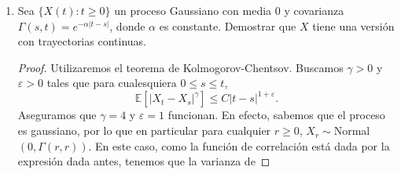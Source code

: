 \documentclass[letterpaper]{article}
\newcommand{\E}{\mathbb{E}}
\newcommand{\1}{\mathds{1}}
\theoremstyle{definition}
\theoremstyle{definition}
\theoremstyle{definition}
\theoremstyle{definition}
\theoremstyle{definition}
\begin{document}
\begin{enumerate}
\begin{proof}
        \begin{align*}
            f_{B(s)|B(t)}(x|y)=\frac{f_{\left(B(s),B(t)\right)}(x,y)}{f_{B(s)}(y)}&=\frac{\frac{1}{2\pi\sqrt{s(t-s)}}\exp\left\{-\frac{tx^2-2sxy+sy^2}{2s(t-s)}\right\}}{\frac{1}{\sqrt{2\pi t}}\exp\{-\frac{y^2}{2t}\}}\\
            &=\frac{1}{\sqrt{2\pi\tfrac{s}{t}(t-s)}}\exp\left\{-\frac{tx^2-2sxy+sy^2}{2s(t-s)}+\frac{y^2}{2t}\right\}\\
            &=\frac{1}{\sqrt{2\pi\tfrac{s}{t}(t-s)}}\exp\left\{-\frac{x^2-2\tfrac{s}{t}xy+\tfrac{s}{t}y^2}{2\tfrac{s}{t}(t-s)}+\frac{y^2}{2t}\right\}\\
            &=\frac{1}{\sqrt{2\pi\tfrac{s}{t}(t-s)}}\exp\left\{-\frac{x^2-2\tfrac{s}{t}xy+(\tfrac{s}{t}y)^2}{2\tfrac{s}{t}(t-s)}+\frac{(\tfrac{s}{t}y)^2-\tfrac{s}{t}y^2}{2\tfrac{s}{t}(t-s)}+\frac{y^2}{2t}\right\}\\
            &=\frac{1}{\sqrt{2\pi\tfrac{s}{t}(t-s)}}\exp\left\{-\frac{(x-\tfrac{s}{t}y)^2}{2\tfrac{s}{t}(t-s)}+\frac{sy^2-ty^2}{2t(t-s)}+\frac{y^2(t-s)}{2t(t-s)}\right\}\\
            &=\frac{1}{\sqrt{2\pi\tfrac{s}{t}(t-s)}}\exp\left\{-\frac{(x-\tfrac{s}{t}y)^2}{2\tfrac{s}{t}(t-s)}\right\},\\
        \end{align*}
        y esta última es la función de densidad de una variable aleatoria Normal con media $\mu=\frac{s}{t}y$ y varianza $\sigma^2=\frac{s}{t}(t-s)$ (la densidad condicional
        es una función del valor que tome $B(t)$). En particular, condicionado a que $B(t)=b$, se tiene que $B(s)$ es una variable normal con media $\mu=\frac{s}{t}b$ y varianza
        dada por $\sigma^2=\tfrac{s}{t}(t-s)$.
     \end{proof}
    \item Sea $\{X(t):t\geq0\}$ un proceso Gaussiano con media 0 y covarianza $\Gamma(s,t)=e^{-\alpha|t-s|}$,
    donde $\alpha$ es constante. Demostrar que $X$ tiene una versión con trayectorias
    continuas.
\begin{proof} 
     Utilizaremos el teorema de Kolmogorov-Chentsov. Buscamos $\gamma>0$ y $\varepsilon>0$ tales que para cualesquiera $0\leq s\leq t$, 
     \[
     \E\left[|X_t-X_s|^\gamma\right]\leq C|t-s|^{1+\varepsilon}.   
     \]
     Aseguramos que $\gamma=4$ y $\varepsilon=1$ funcionan. En efecto, sabemos que el proceso es gaussiano, por lo que en particular para cualquier $r\geq0$, 
     $X_r\sim$Normal$(0,\Gamma(r,r))$. En este caso, como la función de correlación está dada por la expresión dada antes, tenemos que la varianza de 

\end{proof}
\end{enumerate}
\end{document}
